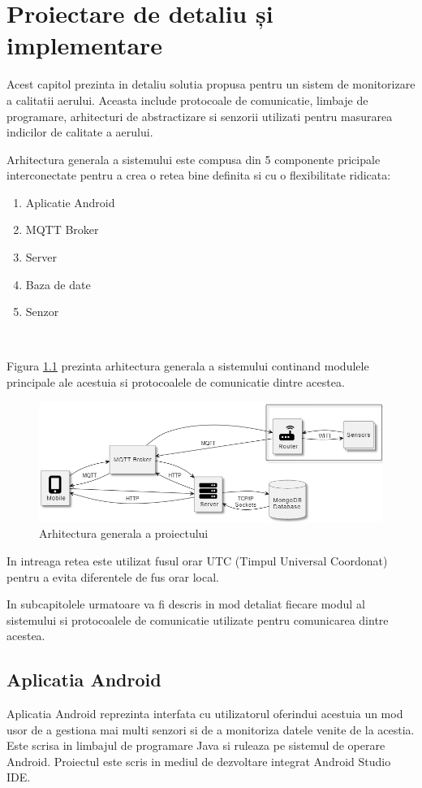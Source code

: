 \chapter{Proiectare de detaliu și implementare}
\pagestyle{fancy}

Acest capitol prezinta in detaliu solutia propusa pentru un sistem de monitorizare a calitatii aerului. Aceasta include protocoale de 
comunicatie, limbaje de programare, arhitecturi de abstractizare si senzorii utilizati pentru masurarea indicilor de calitate a aerului.

Arhitectura generala a sistemului este compusa din 5 componente pricipale interconectate pentru a crea o retea bine definita si cu o flexibilitate
ridicata:
\begin{enumerate}
	\item Aplicatie Android
	\item MQTT Broker
	\item Server
	\item Baza de date
	\item Senzor
\end{enumerate}

\

Figura \ref{fig:ArhitecturaGenerala} prezinta arhitectura generala a sistemului continand modulele principale ale acestuia si protocoalele de comunicatie 
dintre acestea.
\begin{figure}[H]
    \centering
    \includegraphics[scale=0.72]{figs/ArhitecturaGenerala.png}
    \caption{Arhitectura generala a proiectului}
    \label{fig:ArhitecturaGenerala}
\end{figure}

In intreaga retea este utilizat fusul orar UTC (Timpul Universal Coordonat) pentru a evita diferentele de fus orar local.

In subcapitolele urmatoare va fi descris in mod detaliat fiecare modul al sistemului si protocoalele de comunicatie utilizate pentru comunicarea dintre 
acestea.

\section{Aplicatia Android}\label{sec:pi_appandroid}
Aplicatia Android reprezinta interfata cu utilizatorul oferindui acestuia un mod usor de a gestiona mai multi senzori si de a monitoriza datele venite de la
acestia. Este scrisa in limbajul de programare Java si ruleaza pe sistemul de operare Android. Proiectul este scris in mediul de dezvoltare integrat Android 
Studio IDE.

